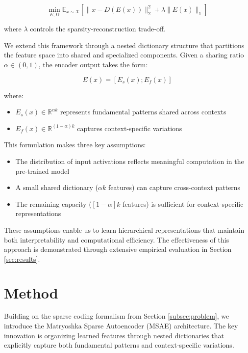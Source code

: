 \documentclass{article} %
\begin{document}
\begin{equation}
    \min_{E,D} \mathbb{E}_{x \sim \mathcal{X}} \left[ \|x - D(E(x))\|_2^2 + \lambda \|E(x)\|_1 \right]
\end{equation}

where $\lambda$ controls the sparsity-reconstruction trade-off.

We extend this framework through a nested dictionary structure that partitions the feature space into shared and specialized components. Given a sharing ratio $\alpha \in (0,1)$, the encoder output takes the form:

\begin{equation}
    E(x) = [E_s(x); E_f(x)]
\end{equation}

where:
\begin{itemize}
    \item $E_s(x) \in \mathbb{R}^{\alpha k}$ represents fundamental patterns shared across contexts
    \item $E_f(x) \in \mathbb{R}^{(1-\alpha)k}$ captures context-specific variations
\end{itemize}

This formulation makes three key assumptions:
\begin{itemize}
    \item The distribution of input activations reflects meaningful computation in the pre-trained model
    \item A small shared dictionary ($\alpha k$ features) can capture cross-context patterns
    \item The remaining capacity ($[1-\alpha]k$ features) is sufficient for context-specific representations
\end{itemize}

These assumptions enable us to learn hierarchical representations that maintain both interpretability and computational efficiency. The effectiveness of this approach is demonstrated through extensive empirical evaluation in Section \ref{sec:results}.

\section{Method}
\label{sec:method}

Building on the sparse coding formalism from Section \ref{subsec:problem}, we introduce the Matryoshka Sparse Autoencoder (MSAE) architecture. The key innovation is organizing learned features through nested dictionaries that explicitly capture both fundamental patterns and context-specific variations.
\end{document}
